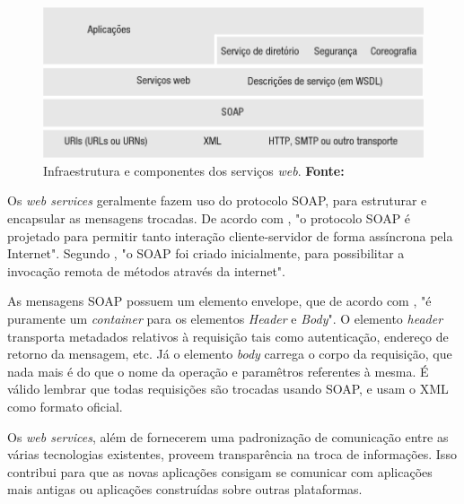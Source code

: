 \begin{figure}[h!]
	\centerline{\includegraphics[scale=0.7]{./imagens/1_q_teorico/qt2.png}}
	\caption[Infraestrutura e componentes dos serviços
		\textit{web}. ]{Infraestrutura e componentes dos serviços
		\textit{web}. \textbf{Fonte:}}
	\label{fig:qt2}
\end{figure}
	
	\par Os \textit{web services} geralmente fazem uso do protocolo SOAP, para
estruturar e encapsular as mensagens trocadas. De acordo com
, "o protocolo SOAP é projetado para permitir
tanto interação cliente-servidor de forma assíncrona pela Internet". Segundo
, "o SOAP foi criado inicialmente, para
possibilitar a invocação remota de métodos através da internet".

	\par As mensagens SOAP possuem um elemento envelope, que de acordo com
, "é puramente um \textit{container} para os
elementos \textit{Header} e \textit{Body}". O elemento \textit{header}
transporta metadados relativos à requisição tais como autenticação, endereço de
retorno da mensagem, etc. Já o elemento \textit{body} carrega o corpo da
requisição, que nada mais é do que o nome da operação e paramêtros referentes à
mesma. É válido lembrar que todas requisições são trocadas usando SOAP, e usam
o XML como formato oficial. 
	

	\par Os \textit{web services}, além de fornecerem uma padronização de
comunicação entre as várias tecnologias existentes, proveem transparência na
troca de informações. Isso contribui para que as novas aplicações consigam se
comunicar com aplicações mais antigas ou aplicações construídas sobre outras
plataformas.

